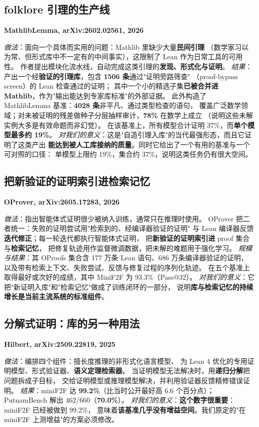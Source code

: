 \documentclass[UTF8,a4paper,11pt,fontset=windows]{ctexart}
\newcommand{\paper}[1]{\par\medskip\noindent\textbf{\color{sgblue!80!black}#1}\par\nobreak\vspace{1pt}}
\newcommand{\field}[1]{\textit{#1}：}
\begin{document}
\subsection{folklore 引理的生产线}

\paper{MathlibLemma, arXiv:2602.02561, 2026}
\field{做法}面向一个具体而实用的问题：Mathlib 里缺少大量\textbf{民间引理}
（数学家习以为常、但形式库中不一定有的中间事实），这限制了 Lean 作为日常工具的可用性。
作者提出模块化流水线，自动完成这类引理的\textbf{发现、形式化与证明}。
\field{结果}产出一个经\textbf{验证的引理库}，包含 \textbf{1506 条}通过"证明旁路筛查"
（proof-bypass screen）的 Lean 检查通过的证明；
其中一个小的精选子集\textbf{已被合并进 Mathlib}，作为"输出能达到专家库标准"的外部证据。
此外构造了 MathlibLemma 基准：\textbf{4028 条}非平凡、通过类型检查的语句，
覆盖广泛数学领域；对未被证明的残差做种子分层抽样审计，\textbf{78\%} 在数学上成立
（说明这些未解实例大多是有效命题而非幻觉）。
在该基准上，所有模型合计证明 37\%，而\textbf{单个模型最多约 19\%}。
\field{对我们的意义}这是"自造引理入库"的当代最强形态，而且它证明了这类产出
\textbf{能达到被人工库接纳的质量}。同时它给出了一个有用的基准与一个可对照的口径：
单模型上限约 19\%，集合约 37\%，说明这类任务仍有很大空间。

\subsection{把新验证的证明索引进检索记忆}

\paper{OProver, arXiv:2605.17283, 2026}
\field{做法}指出智能体式证明很少被纳入训练，通常只在推理时使用。
OProver 把二者统一：失败的证明尝试用"检索到的、经编译器验证的证明"
与 Lean 编译器反馈\textbf{迭代修正}；每一轮迭代都执行智能体式证明，
把\textbf{新验证的证明索引进} proof 集合与\textbf{检索记忆}，
把修复轨迹用作监督微调数据，把未解的难题用于强化学习。
\field{规模与结果}其 OProofs 集合含 177 万条 Lean 语句、686 万条编译器验证的证明，
以及带有检索上下文、失败尝试、反馈与修复过程的序列化轨迹。
在五个基准上取得最好或次好的成绩，其中 MiniF2F 为 93.3\%（Pass@32）。
\field{对我们的意义}它把"新证明入库"和"检索记忆"做成了训练闭环的一部分，
说明\textbf{库与检索记忆的持续增长是当前主流系统的标准组件}。

\subsection{分解式证明：库的另一种用法}

\paper{Hilbert, arXiv:2509.22819, 2025}
\field{做法}编排四个组件：擅长度推理的非形式化语言模型、
为 Lean 4 优化的专用证明模型、形式验证器、\textbf{语义定理检索器}。
当证明模型无法解决时，用\textbf{递归分解}把问题拆成子目标，
交给证明模型或推理模型解决，并利用验证器反馈精修错误证明。
\field{结果}miniF2F 达 \textbf{99.2\%}（比当时公开最好高 6.6 个百分点）；
PutnamBench 解出 462/660（\textbf{70.0\%}）。
\field{对我们的意义}\textbf{这个数字很重要}：miniF2F 已经被做到 99.2\%，
意味着\textbf{该基准几乎没有增益空间}。我们原定的"在 miniF2F 上测增益"的方案必须修改。
\end{document}
